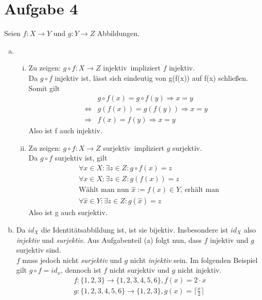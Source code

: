 \documentclass{scrreprt}
\begin{document}
	\section*{Aufgabe 4}
	Seien $f \colon X \to Y$ und $g \colon Y \to Z$ Abbildungen.
	\begin{enumerate}[a)]
		\item
			\begin{enumerate}[(i)]
				\item
					Zu zeigen: \glqq$g \circ f \colon X \to Z$ injektiv\grqq \ impliziert \glqq$f$ injektiv\grqq.\\
					Da $g \circ f$ injektiv ist, lässt sich eindeutig von g(f(x)) auf f(x) schließen. Somit gilt
					\begin{align*}
						& g \circ f (x) = g \circ f (y) \Rightarrow x = y\\
						\Leftrightarrow & g(f(x)) = g(f(y)) \Rightarrow x = y\\
						\Rightarrow & f(x) = f(y) \Rightarrow x = y
					\end{align*}
					Also ist f auch injektiv.
				\item
					Zu zeigen: \glqq$g \circ f \colon X \to Z$ surjektiv\grqq \  impliziert \glqq$g$ surjektiv\grqq.\\
					Da $g \circ f$ surjektiv ist, gilt
					\begin{align*}
						&\forall x \in X: \exists z \in Z: g \circ f (x) = z\\
						&\forall x \in X: \exists z \in Z: g(f (x)) = z\\
						&\text{Wählt man nun $\hat{x} := f(x) \in Y$, erhält man}\\
						&\forall \hat{x} \in Y: \exists z \in Z: g(\hat{x}) = z
					\end{align*}
					Also ist g auch surjektiv.
			\end{enumerate}
		\item
			Da $id_X$ die Identitätsabbildung ist, ist sie bijektiv. Insbesondere ist $id_X$ also \emph{injektiv} und \emph{surjektiv}. Aus Aufgabenteil (a) folgt nun, dass $f$ injektiv und $g$ surjektiv sind.\\
			$f$ muss jedoch nicht \emph{surjektiv} und $g$ nicht \emph{injektiv} sein. Im folgenden Beispiel gilt $g \circ f = id_x$, dennoch ist $f$ nicht surjektiv und $g$ nicht injektiv.
			\begin{align*}
				f \colon \lbrace 1,2,3 \rbrace  \to  \lbrace 1,2,3,4,5,6\rbrace, f(x) = 2 \cdot x\\
				g \colon \lbrace 1,2,3,4,5,6 \rbrace   \to  \lbrace 1,2,3\rbrace, g(x) = \lceil \frac{x}{2}\rceil
			\end{align*}
	\end{enumerate}
\end{document}
